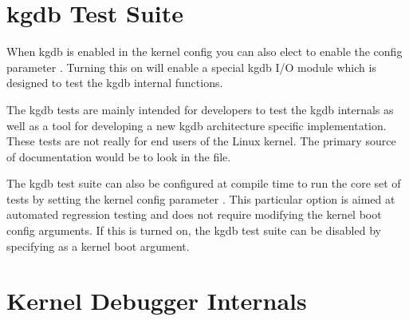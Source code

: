 \documentclass[a4paper,8pt,english]{sphinxmanual}
\begin{document}
\section{kgdb Test Suite}
\label{dev-tools/kgdb:kgdb-test-suite}
When kgdb is enabled in the kernel config you can also elect to enable
the config parameter . Turning this on will enable a special
kgdb I/O module which is designed to test the kgdb internal functions.

The kgdb tests are mainly intended for developers to test the kgdb
internals as well as a tool for developing a new kgdb architecture
specific implementation. These tests are not really for end users of the
Linux kernel. The primary source of documentation would be to look in
the  file.

The kgdb test suite can also be configured at compile time to run the
core set of tests by setting the kernel config parameter
. This particular option is aimed at automated
regression testing and does not require modifying the kernel boot config
arguments. If this is turned on, the kgdb test suite can be disabled by
specifying  as a kernel boot argument.


\section{Kernel Debugger Internals}
\label{dev-tools/kgdb:kernel-debugger-internals}
\end{document}
